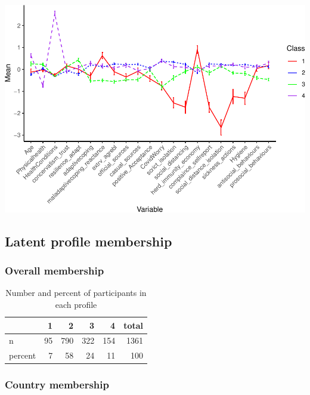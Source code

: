 \documentclass[]{article}
\begin{document}
\includegraphics{lpa_analyses_files/figure-latex/unnamed-chunk-15-1.pdf}

\hypertarget{latent-profile-membership-2}{%
\subsection{Latent profile
membership}\label{latent-profile-membership-2}}

\hypertarget{overall-membership-2}{%
\subsubsection{Overall membership}\label{overall-membership-2}}

\begin{table}[H]

\caption{\label{tab:unnamed-chunk-16}Number and percent of participants in each profile}
\centering
\fontsize{6}{8}\selectfont
\begin{tabular}[t]{lrrrrr}
\toprule
  & 1 & 2 & 3 & 4 & total\\
\midrule
n & 95 & 790 & 322 & 154 & 1361\\
percent & 7 & 58 & 24 & 11 & 100\\
\bottomrule
\end{tabular}
\end{table}

\hypertarget{country-membership-2}{%
\subsubsection{Country membership}\label{country-membership-2}}
\end{document}
